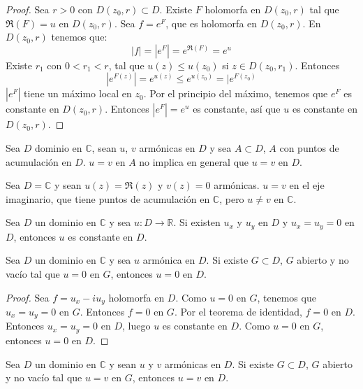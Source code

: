 \begin{proof}
    Sea $r > 0$ con $D(z_0, r) \subset D$.
    Existe $F$ holomorfa en $D(z_0, r)$ tal que $\Re(F) = u$ en $D(z_0, r)$.
    Sea $f = e^F$, que es holomorfa en $D(z_0, r)$.
    En $D(z_0, r)$ tenemos que:
    $$|f| = |e^F| = e^{\Re(F)} = e^u$$
    Existe $r_1$ con $0 < r_1 < r$, tal que $u(z) \leq u(z_0)$ si $z \in D(z_0, r_1)$.
    Entonces
    $$|e^{F(z)}| = e^{u(z)} \leq e^{u(z_0)} = |e^{F(z_0)}$$
    $|e^F|$ tiene un máximo local en $z_0$.
    Por el principio del máximo, tenemos que $e^F$ es constante en $D(z_0, r)$.
    Entonces $|e^F| = e^u$ es constante, así que $u$ es constante en $D(z_0, r)$.
\end{proof}

Sea $D$ dominio en $\mathbb{C}$, sean $u$, $v$ armónicas en $D$ y sea $A \subset D$, $A$ con puntos de acumulación en $D$.
$u = v$ en $A$ no implica en general que $u = v$ en $D$.

\begin{example}[Contraejemplo]
    Sea $D = \mathbb{C}$ y sean $u(z) = \Re(z)$ y $v(z) = 0$ armónicas.
    $u = v$ en el eje imaginario, que tiene puntos de acumulación en $\mathbb{C}$, pero $u \neq v$ en $\mathbb{C}$.
\end{example}

\begin{remark}
    Sea $D$ un dominio en $\mathbb{C}$ y sea $u: D \to \mathbb{R}$.
    Si existen $u_x$ y $u_y$ en $D$ y $u_x = u_y = 0$ en $D$, entonces $u$ es constante en $D$.
\end{remark}

\begin{theorem}
    Sea $D$ un dominio en $\mathbb{C}$ y sea $u$ armónica en $D$.
    Si existe $G \subset D$, $G$ abierto y no vacío tal que $u = 0$ en $G$, entonces $u = 0$ en $D$.
\end{theorem}

\begin{proof}
    Sea $f = u_x - iu_y$ holomorfa en $D$.
    Como $u = 0$ en $G$, tenemos que $u_x = u_y = 0$ en $G$.
    Entonces $f = 0$ en $G$.
    Por el teorema de identidad, $f = 0$ en $D$.
    Entonces $u_x = u_y = 0$ en $D$, luego $u$ es constante en $D$.
    Como $u = 0$ en $G$, entonces $u = 0$ en $D$.
\end{proof}

\begin{corollary}
    Sea $D$ un dominio en $\mathbb{C}$ y sean $u$ y $v$ armónicas en $D$.
    Si existe $G \subset D$, $G$ abierto y no vacío tal que $u = v$ en $G$, entonces $u = v$ en $D$.
\end{corollary}

